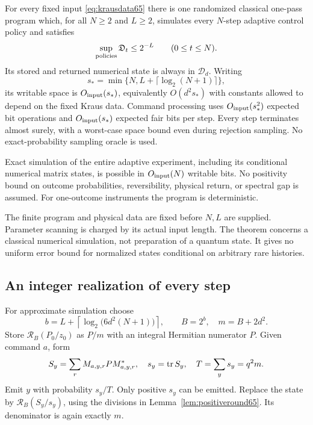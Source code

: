 \begin{theorem}\label{thm:instrumentstream65}
For every fixed input \eqref{eq:krausdata65} there is one randomized
classical one-pass program which, for all $N\ge2$ and $L\ge2$,
simulates every $N$-step adaptive control policy and satisfies
\begin{equation}\label{eq:instrumenterror65}
                  \sup_{\rm policies}\mathfrak D_t\le2^{-L}
                         \qquad(0\le t\le N).
\end{equation}
Its stored and returned numerical state is always in $\mathcal D_d$.
Writing
\[
 s_*=\min\{N,L+\lceil\log_2(N+1)\rceil\},
\]
its writable space is $O_{\rm input}(s_*)$, equivalently
$O(d^2s_*)$ with constants allowed to depend on the fixed Kraus data.
Command processing uses $O_{\rm input}(s_*^2)$ expected bit operations
and $O_{\rm input}(s_*)$ expected fair bits per step. Every step
terminates almost surely, with a worst-case space bound even during
rejection sampling. No exact-probability sampling oracle is used.

Exact simulation of the entire adaptive experiment, including its
conditional numerical matrix states, is possible in
$O_{\rm input}(N)$ writable bits. No positivity bound on outcome
probabilities, reversibility, physical return, or spectral gap is
assumed. For one-outcome instruments the program is deterministic.
\end{theorem}
The finite program and physical data are fixed before $N,L$ are
supplied. Parameter scanning is charged by its actual input length.
The theorem concerns a classical numerical simulation, not preparation
of a quantum state. It gives no uniform error bound for normalized
states conditional on arbitrary rare histories.

\subsection{An integer realization of every step}
For approximate simulation choose
\begin{equation}\label{eq:instrumentprecision65}
 b=L+\left\lceil\log_2\bigl(6d^2(N+1)\bigr)\right\rceil,\qquad
 B=2^b,\quad m=B+2d^2.
\end{equation}
Store $\mathcal R_B(P_0/z_0)$ as $P/m$ with an integral Hermitian
numerator $P$. Given command $a$, form
\begin{equation}\label{eq:instrumentintegers65}
 S_y=\sum_r M_{a,y,r}P M_{a,y,r}^*,\quad
 s_y=\operatorname{tr} S_y,\quad T=\sum_y s_y=q^2m.
\end{equation}
Emit $y$ with probability $s_y/T$. Only positive $s_y$ can be emitted.
Replace the state by $\mathcal R_B(S_y/s_y)$, using the divisions in
Lemma~\ref{lem:positiveround65}. Its denominator is again exactly $m$.

